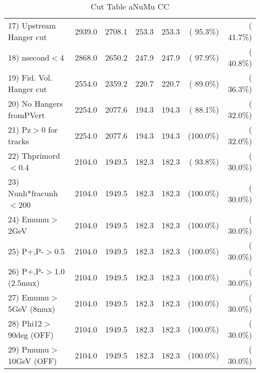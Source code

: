 \begin{table}[h!]
\begin{tabular}{||l||r|r|r|r|r|r||}
 17) Upstream Hanger cut  &       2939.0 &       2708.1 &        253.3 &        253.3 & ( 95.3\%) & ( 41.7\%) \\
 18) nsecond$<$4          &       2868.0 &       2650.2 &        247.9 &        247.9 & ( 97.9\%) & ( 40.8\%) \\
 19) Fid. Vol. Hanger cut &       2554.0 &       2359.2 &        220.7 &        220.7 & ( 89.0\%) & ( 36.3\%) \\
 20) No Hangers fromPVert &       2254.0 &       2077.6 &        194.3 &        194.3 & ( 88.1\%) & ( 32.0\%) \\
 21) Pz$>$0 for tracks    &       2254.0 &       2077.6 &        194.3 &        194.3 & (100.0\%) & ( 32.0\%) \\
 22) Thprimord$<$0.4      &       2104.0 &       1949.5 &        182.3 &        182.3 & ( 93.8\%) & ( 30.0\%) \\
 23) Nunh*fracunh$<$200   &       2104.0 &       1949.5 &        182.3 &        182.3 & (100.0\%) & ( 30.0\%) \\
 24) Emumu$>$2GeV         &       2104.0 &       1949.5 &        182.3 &        182.3 & (100.0\%) & ( 30.0\%) \\
 25) P+,P-$>$0.5          &       2104.0 &       1949.5 &        182.3 &        182.3 & (100.0\%) & ( 30.0\%) \\
 26) P+,P-$>$1.0 (2.5mux) &       2104.0 &       1949.5 &        182.3 &        182.3 & (100.0\%) & ( 30.0\%) \\
 27) Emumu$>$5GeV  (8mux) &       2104.0 &       1949.5 &        182.3 &        182.3 & (100.0\%) & ( 30.0\%) \\
 28) Phi12$>$90deg  (OFF) &       2104.0 &       1949.5 &        182.3 &        182.3 & (100.0\%) & ( 30.0\%) \\
 29) Pmumu$>$10GeV  (OFF) &       2104.0 &       1949.5 &        182.3 &        182.3 & (100.0\%) & ( 30.0\%) \\
 \hline
 \hline
 \end{tabular}
 \caption{Cut Table  aNuMu CC }
 \label{tab-cutcohjpsi-mumu_anumucc}
 \end{table}
